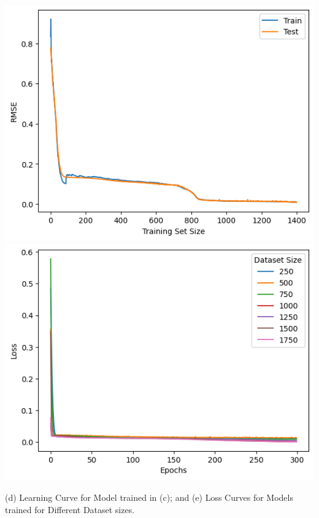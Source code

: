 \documentclass{article}
\begin{document}
\includegraphics[scale=0.5]{../images/learning_curve.png}
\includegraphics[scale=0.5]{../images/loss_curves.png}
\begin{center} (d) Learning Curve for Model trained in (c); and (e) Loss Curves for Models trained for Different Dataset sizes.\end{center}
\end{document}
